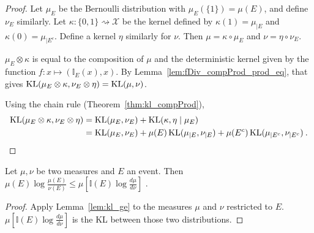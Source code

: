 \begin{proof}
Let $\mu_E$ be the Bernoulli distribution with $\mu_E(\{1\}) = \mu(E)$, and define $\nu_E$ similarly.
Let $\kappa : \{0,1\} \rightsquigarrow \mathcal X$ be the kernel defined by $\kappa(1) = \mu_{|E}$ and $\kappa(0) = \mu_{|E^c}$. Define a kernel $\eta$ similarly for $\nu$.
Then $\mu = \kappa \circ \mu_E$ and $\nu = \eta \circ \nu_E$.

$\mu_E \otimes \kappa$ is equal to the composition of $\mu$ and the deterministic kernel given by the function $f : x \mapsto (\mathbb{I}_E(x), x)$. By Lemma~\ref{lem:fDiv_compProd_prod_eq}, that gives $\operatorname{KL}(\mu_E \otimes \kappa, \nu_E \otimes \eta) = \operatorname{KL}(\mu, \nu)$.

Using the chain rule (Theorem~\ref{thm:kl_compProd}),
\begin{align*}
\operatorname{KL}(\mu_E \otimes \kappa, \nu_E \otimes \eta)
&= \operatorname{KL}(\mu_E, \nu_E) + \operatorname{KL}(\kappa, \eta \mid \mu_E)
\\
&= \operatorname{KL}(\mu_E, \nu_E) + \mu(E) \operatorname{KL}(\mu_{|E}, \nu_{|E}) + \mu(E^c) \operatorname{KL}(\mu_{|E^c}, \nu_{|E^c})
\: .
\end{align*}

\end{proof}

\begin{lemma}
  \label{lem:expectation_llr_event}
  Let $\mu, \nu$ be two measures and $E$ an event. Then
  $\mu(E)\log\frac{\mu(E)}{\nu(E)} \le \mu\left[\mathbb{I}(E)\log \frac{d \mu}{d \nu}\right]$ .
\end{lemma}

\begin{proof}
Apply Lemma~\ref{lem:kl_ge} to the measures $\mu$ and $\nu$ restricted to $E$. $\mu\left[\mathbb{I}(E)\log \frac{d \mu}{d \nu}\right]$ is the KL between those two distributions.
\end{proof}